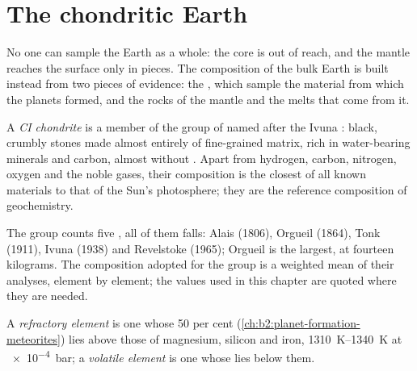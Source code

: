 \section{The chondritic Earth}

No one can sample the Earth as a whole: the core is out of reach, and the
mantle reaches the surface only in pieces. The composition of the bulk Earth is
built instead from two pieces of evidence: the , which sample the
material from which the planets formed, and the rocks of the mantle and the
melts that come from it.

\begin{definition}[CI chondrite]\label{def:b2:elements-in-the-earth:ci}
A \emph{CI chondrite} is a member of the group of
 named after the Ivuna : black, crumbly stones
made almost entirely of fine-grained matrix, rich in water-bearing minerals and
carbon, almost without . Apart from hydrogen, carbon, nitrogen, oxygen and the
noble gases, their composition is the closest of all known materials to that of
the Sun's photosphere; they are the reference composition of geochemistry.
\end{definition}

The group counts five , all of them falls: Alais (1806), Orgueil
(1864), Tonk (1911), Ivuna (1938) and Revelstoke (1965); Orgueil is the largest,
at fourteen kilograms. The composition adopted for the group is a weighted mean
of their analyses, element by element; the values used in this chapter are
quoted where they are needed.

\begin{definition}
\label{def:b2:elements-in-the-earth:volatility}
A \emph{refractory element} is one whose 50 per cent
 (\cref{ch:b2:planet-formation-meteorites}) lies above
those of magnesium, silicon and iron, \qtyrange{1310}{1340}{K} at
\qty{e-4}{bar}; a
\emph{volatile element} is one whose  lies below them.
\end{definition}

